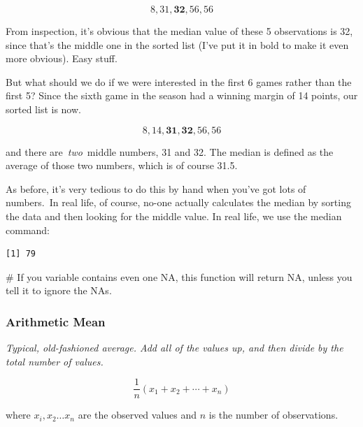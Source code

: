 \documentclass[
  letterpaper,
  DIV=11,
  numbers=noendperiod]{scrartcl}
\newenvironment{Shaded}{\begin{snugshade}}{\end{snugshade}}
\newcommand{\AttributeTok}[1]{\textcolor[rgb]{0.40,0.45,0.13}{#1}}
\newcommand{\CommentTok}[1]{\textcolor[rgb]{0.37,0.37,0.37}{#1}}
\newcommand{\ConstantTok}[1]{\textcolor[rgb]{0.56,0.35,0.01}{#1}}
\newcommand{\FunctionTok}[1]{\textcolor[rgb]{0.28,0.35,0.67}{#1}}
\newcommand{\NormalTok}[1]{\textcolor[rgb]{0.00,0.23,0.31}{#1}}
\newcommand{\SpecialCharTok}[1]{\textcolor[rgb]{0.37,0.37,0.37}{#1}}
\begin{document}
\[8, 31,\mathbf{32},56,56 \]

From inspection, it's obvious that the median value of these 5
observations is 32, since that's the middle one in the sorted list (I've
put it in bold to make it even more obvious). Easy stuff.

But what should we do if we were interested in the first 6 games rather
than the first 5? Since the sixth game in the season had a winning
margin of 14 points, our sorted list is now.

\[8,14,\mathbf{31,32},56,56\]

and there are~\emph{two}~middle numbers, 31 and 32. The median is
defined as the average of those two numbers, which is of course 31.5.~

As before, it's very tedious to do this by hand when you've got lots of
numbers.~In real life, of course, no-one actually calculates the median
by sorting the data and then looking for the middle value. In real life,
we use the median command:

\begin{Shaded}
\end{Shaded}

\begin{verbatim}
[1] 79
\end{verbatim}

\begin{Shaded}
\begin{Highlighting}[]
\CommentTok{\# If you variable contains even one NA, this function will return NA, unless you tell it to ignore the NAs. }
\end{Highlighting}
\end{Shaded}

\subsubsection{Arithmetic Mean}\label{arithmetic-mean}

\emph{Typical, old-fashioned average. Add all of the values up, and then
divide by the total number of values.}

\[\frac{1}{n}\left(x_1 + x_2 + \cdots + x_n\right)\]

where \(x_i, x_2 \ldots x_n\) are the observed values and \(n\) is the
number of observations.
\end{document}
